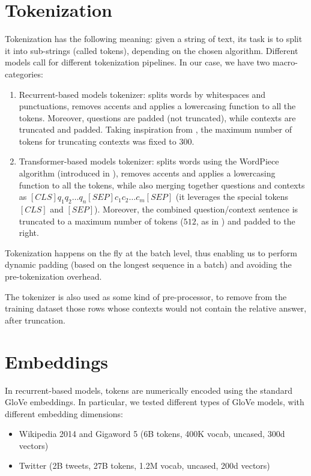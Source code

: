 \documentclass[a4paper,10pt]{report}
\begin{document}
\section{Tokenization}
Tokenization has the following meaning: given a string of text, its task is to split it into sub-strings (called tokens), depending on the chosen algorithm. Different models call for different tokenization pipelines. In our case, we have two macro-categories:
\begin{enumerate}
  \item Recurrent-based models tokenizer: splits words by whitespaces and punctuations, removes accents and applies a lowercasing function to all the tokens. Moreover, questions are padded (not truncated), while contexts are truncated and padded. Taking inspiration from \cite{max-context-tokens}, the maximum number of tokens for truncating contexts was fixed to $300$. 
  \item Transformer-based models tokenizer: splits words using the WordPiece algorithm (introduced in \cite{wordpiece}), removes accents and applies a lowercasing function to all the tokens, while also merging together questions and contexts as $[CLS] q_1 q_2 \dots q_n [SEP] c_1 c_2 \dots c_m [SEP]$ (it leverages the special tokens $[CLS]$ and $[SEP]$). Moreover, the combined question/context sentence is truncated to a maximum number of tokens ($512$, as in \cite{bert}) and padded to the right.
\end{enumerate} 
Tokenization happens on the fly at the batch level, thus enabling us to perform dynamic padding (based on the longest sequence in a batch) and avoiding the pre-tokenization overhead.

The tokenizer is also used as some kind of pre-processor, to remove from the training dataset those rows whose contexts would not contain the relative answer, after truncation. 

\section{Embeddings}
In recurrent-based models, tokens are numerically encoded using the standard GloVe embeddings. In particular, we tested different types of GloVe models, with different embedding dimensions:
\begin{itemize}
  \item Wikipedia 2014 and Gigaword 5 (6B tokens, 400K vocab, uncased, 300d vectors)
  \item Twitter (2B tweets, 27B tokens, 1.2M vocab, uncased, 200d vectors)
\end{itemize}
\end{document}

